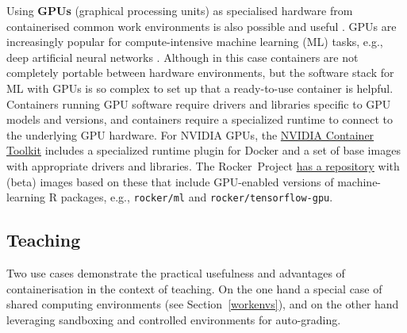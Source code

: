 \label{rocker-gpu} Using \textbf{GPUs} (graphical processing units) as
specialised hardware from containerised common work environments is also
possible and useful \citep{haydel_enhancing_2015}. GPUs are increasingly
popular for compute-intensive machine learning (ML) tasks, e.g., deep
artificial neural networks \citep{schmidhuber_deep_2015}. Although in
this case containers are not completely portable between hardware
environments, but the software stack for ML with GPUs is so complex to
set up that a ready-to-use container is helpful. Containers running GPU
software require drivers and libraries specific to GPU models and
versions, and containers require a specialized runtime to connect to the
underlying GPU hardware. For NVIDIA GPUs, the
\href{https://github.com/NVIDIA/nvidia-docker}{NVIDIA Container Toolkit}
includes a specialized runtime plugin for Docker and a set of base
images with appropriate drivers and libraries. The Rocker~Project
\href{https://github.com/rocker-org/ml}{has a repository} with (beta)
images based on these that include GPU-enabled versions of
machine-learning R packages, e.g., \texttt{rocker/ml} and
\texttt{rocker/tensorflow-gpu}.

\hypertarget{teaching}{%
\subsection{Teaching}\label{teaching}}

Two use cases demonstrate the practical usefulness and advantages of
containerisation in the context of teaching. On the one hand a special
case of shared computing environments (see Section~\ref{workenvs}), and
on the other hand leveraging sandboxing and controlled environments for
auto-grading.

